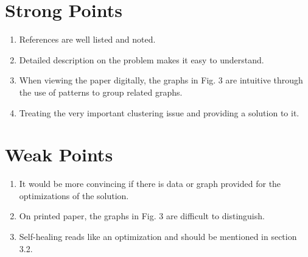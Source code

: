 \documentclass[conference]{IEEEtran}
\begin{document}
\section{Strong Points}

\begin{enumerate}
\item References are well listed and noted.
\item Detailed description on the problem makes it easy to understand.
\item When viewing the paper digitally, the graphs in Fig. 3 are intuitive through the use of patterns to group related graphs.
\item Treating the very important clustering issue and providing a solution to it.
\end{enumerate}


\section{Weak Points}
\begin{enumerate}
\item It would be more convincing if there is data or graph provided for the optimizations of the solution.
\item On printed paper, the graphs in Fig. 3 are difficult to distinguish.
\item Self-healing reads like an optimization and should be mentioned in section 3.2.
\end{enumerate}









\end{document}
